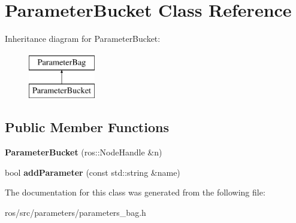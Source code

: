 \hypertarget{classParameterBucket}{
\section{ParameterBucket Class Reference}
\label{classParameterBucket}
}
Inheritance diagram for ParameterBucket:\begin{figure}[H]
\begin{center}
\leavevmode
\includegraphics[height=2.000000cm]{classParameterBucket}
\end{center}
\end{figure}
\subsection*{Public Member Functions}
\begin{DoxyCompactItemize}
\item 
\hypertarget{classParameterBucket_a4e5220ad774903c93d62400508604d01}{
{\bfseries ParameterBucket} (ros::NodeHandle \&n)}
\label{classParameterBucket_a4e5220ad774903c93d62400508604d01}

\item 
\hypertarget{classParameterBucket_af2e5e3fd787b7f8962bdedd1dc1616a8}{
bool {\bfseries addParameter} (const std::string \&name)}
\label{classParameterBucket_af2e5e3fd787b7f8962bdedd1dc1616a8}

\end{DoxyCompactItemize}


The documentation for this class was generated from the following file:\begin{DoxyCompactItemize}
\item 
ros/src/parameters/parameters\_\-bag.h\end{DoxyCompactItemize}
